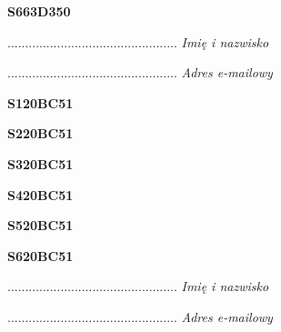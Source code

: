 \begin{turn}{90}\huge \textbf{S663D350}\end{turn}

\begin{turn}{90}\begin{minipage}{\linewidth} \vspace{20mm} ................................................  \textit{Imię i nazwisko}\end{minipage}\end{turn}

\begin{turn}{90}\begin{minipage}{\linewidth} \vspace{20mm} ................................................  \textit{Adres e-mailowy}\end{minipage}\end{turn}

\begin{turn}{90}\huge \textbf{S120BC51}\end{turn}

\begin{turn}{90}\huge \textbf{S220BC51}\end{turn}

\begin{turn}{90}\huge \textbf{S320BC51}\end{turn}

\begin{turn}{90}\huge \textbf{S420BC51}\end{turn}

\begin{turn}{90}\huge \textbf{S520BC51}\end{turn}

\begin{turn}{90}\huge \textbf{S620BC51}\end{turn}

\begin{turn}{90}\begin{minipage}{\linewidth} \vspace{20mm} ................................................  \textit{Imię i nazwisko}\end{minipage}\end{turn}

\begin{turn}{90}\begin{minipage}{\linewidth} \vspace{20mm} ................................................  \textit{Adres e-mailowy}\end{minipage}\end{turn}

